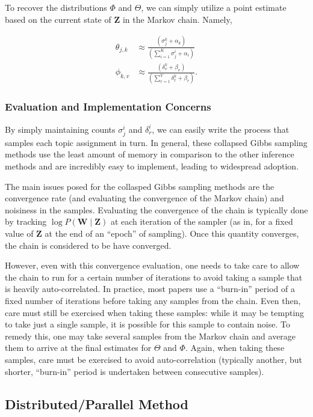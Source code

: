 \documentclass[11pt]{article}
\begin{document}
To recover the distributions $\Phi$ and $\Theta$, we can simply utilize a
point estimate based on the current state of $\mathbf{Z}$ in the Markov
chain. Namely,

\begin{align}
  \theta_{j,k}
  &\approx
  \frac{(\sigma_j^k + \alpha_k)}
  {\left(\sum_{i=1}^K \sigma_j^i + \alpha_i\right)}\\
  \phi_{k,v}
  &\approx
  \frac{(\delta_v^k + \beta_v)}
  {\left(\sum_{r=1}^V \delta_r^k + \beta_r\right)}.
\end{align}

\subsubsection{Evaluation and Implementation Concerns}

By simply maintaining counts $\sigma_j^i$ and $\delta_r^i$, we can
easily write the process that samples each topic assignment in turn. In
general, these collapsed Gibbs sampling methods use the least amount of
memory in comparison to the other inference methods and are incredibly easy
to implement, leading to widespread adoption.

The main issues posed for the collasped Gibbs sampling methods are the
convergence rate (and evaluating the convergence of the Markov chain) and
noisiness in the samples. Evaluating the convergence of the chain is
typically done by tracking $\log P(\mathbf{W} \mid \mathbf{Z})$ at each
iteration of the sampler (as in, for a fixed value of $\mathbf{Z}$ at the
end of an ``epoch'' of sampling). Once this quantity converges, the chain
is considered to be have converged.

However, even with this convergence evaluation, one needs to take care to
allow the chain to run for a certain number of iterations to avoid taking a
sample that is heavily auto-correlated. In practice, most papers use a
``burn-in'' period of a fixed number of iterations before taking any
samples from the chain. Even then, care must still be exercised when taking
these samples: while it may be tempting to take just a single sample, it is
possible for this sample to contain noise. To remedy this, one may take
several samples from the Markov chain and average them to arrive at the
final estimates for $\Theta$ and $\Phi$. Again, when taking these samples,
care must be exercised to avoid auto-correlation (typically another, but
shorter, ``burn-in'' period is undertaken between consecutive samples).

\subsection{Distributed/Parallel Method}
\end{document}
